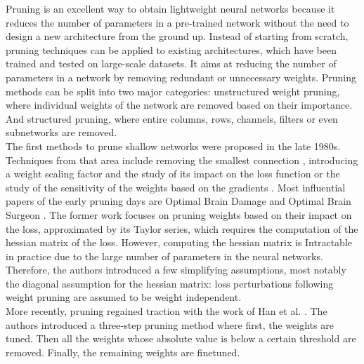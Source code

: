 Pruning is an excellent way to obtain lightweight neural networks because it
reduces the number of parameters in a pre-trained network without the need to
design a new architecture from the ground up. Instead of starting from scratch,
pruning techniques can be applied to existing architectures, which have been
trained and tested on large-scale datasets. It aims at reducing the number of
parameters in a network by removing redundant or unnecessary weights. Pruning
methods can be split into two major categories: unstructured weight pruning,
where individual weights of the network are removed based on their importance.
And structured pruning, where entire columns, rows, channels, filters or even
subnetworks are removed. \\


The first methods to prune shallow networks were proposed in the late 1980s.
Techniques from that area include removing the smallest connection
\cite{janowsky1989pruning}, introducing a weight scaling factor and the study of
its impact on the loss function \cite{DBLP:conf/nips/MozerS88} or the study of
the sensitivity of the weights based on the gradients
\cite{DBLP:journals/tnn/Karnin90}. Most influential papers of the early pruning
days are Optimal Brain Damage \cite{DBLP:conf/nips/CunDS89} and Optimal Brain
Surgeon
\cite{DBLP:conf/nips/HassibiS92,DBLP:conf/nips/HassibiSW93,DBLP:conf/icnn/HassibiSW93}.
The former work focuses on pruning weights based on their impact on the loss,
approximated by its Taylor series, which requires the computation of the hessian
matrix of the loss. However, computing the hessian matrix is Intractable in
practice due to the large number of parameters in the neural networks.
Therefore, the authors introduced a few simplifying assumptions, most notably
the diagonal assumption for the hessian matrix: loss perturbations following
weight pruning are assumed to be weight independent. \\


More recently, pruning regained traction with the work of Han et al.
\cite{DBLP:conf/nips/HanPTD15}.  The authors introduced a three-step pruning
method where first, the weights are tuned. Then all the weights whose absolute
value is below a certain threshold are removed. Finally, the remaining weights
are finetuned. \\


